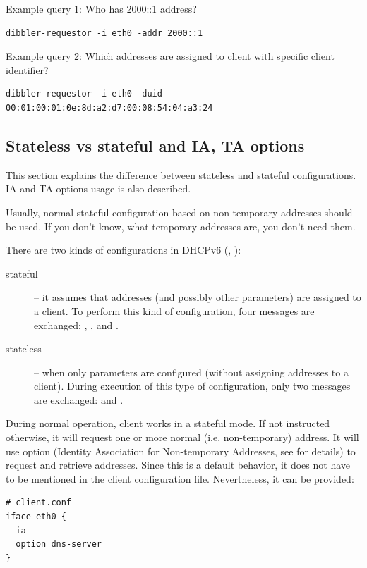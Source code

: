 Example query 1: Who has 2000::1 address?

\begin{lstlisting}
dibbler-requestor -i eth0 -addr 2000::1
\end{lstlisting}

Example query 2: Which addresses are assigned to client with specific client
identifier?

\begin{lstlisting}
dibbler-requestor -i eth0 -duid 00:01:00:01:0e:8d:a2:d7:00:08:54:04:a3:24
\end{lstlisting}

\subsection{Stateless vs stateful and IA, TA options}
\label{features-stateless-stateful}
This section explains the difference between stateless and stateful
configurations. IA and TA options usage is also described.

Usually, normal stateful configuration based on non-temporary
addresses should be used. If you don't know, what temporary addresses
are, you don't need them.

There are two kinds of configurations in DHCPv6 (\cite{rfc3315}, \cite{rfc3736}):
\begin{description}
  \item[stateful] -- it assumes that addresses (and possibly other parameters)
    are assigned to a client. To perform this kind of configuration,
    four messages are exchanged: , ,
     and .
  \item[stateless] -- when only parameters are configured (without
    assigning addresses to a client). During execution of this type of
    configuration, only two messages are exchanged: 
    and .
\end{description}

During normal operation, client works in a stateful mode. If not
instructed otherwise, it will request one or more normal (i.e. non-temporary)
address. It will use  option (Identity Association for
Non-temporary Addresses, see \cite{rfc3315} for details) to request
and retrieve addresses. Since this is a default behavior, it does not
have to be mentioned in the client configuration
file. Nevertheless, it can be provided:

\begin{lstlisting}
# client.conf
iface eth0 {
  ia
  option dns-server
}
\end{lstlisting}

